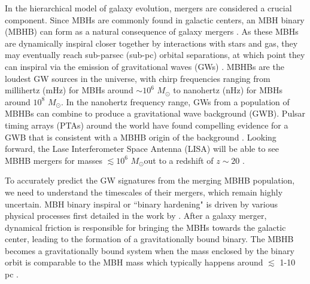 \documentclass{book}
\newcommand{\msun}{\ensuremath{M_{\odot}}}
\begin{document}
In the hierarchical model of galaxy evolution, mergers are considered a crucial component. Since MBHs are commonly found in galactic centers, an MBH binary (MBHB) can form as a natural consequence of galaxy mergers \citep{Begelman1980}. As these MBHs are dynamically inspiral closer together by interactions with stars and gas, they may eventually reach sub-parsec (sub-pc) orbital separations, at which point they can inspiral via the emission of gravitational waves (GWs) \citep{PetersandMathews1964}. MBHBs are the loudest GW sources in the universe, with chirp frequencies ranging from millihertz (mHz) for MBHs around $\sim 10^6$ \msun{} to nanohertz (nHz) for MBHs around $10^8$ \msun \citep{Sesana2013}. In the nanohertz frequency range, GWs from a population of MBHBs can combine to produce a gravitational wave background (GWB). Pulsar timing arrays (PTAs) around the world have found compelling evidence for a GWB that is consistent with a MBHB origin of the background \citep{agazie_nanograv_2023,antoniadis_second_2023,reardon_search_2023,xu_searching_2023}. Looking forward, the Lase Interferometer Space Antenna (LISA) will be able to see MBHB mergers for masses  $\lesssim 10^6$  \msun out to a redshift of $z \sim 20$ \citep{amaroseoane2017laserinterferometerspaceantenna}. 

To accurately predict the GW signatures from the merging MBHB population, we need to understand the timescales of their mergers, which remain highly uncertain. MBH binary inspiral or ``binary hardening" is driven by various physical processes first detailed in the work by \citet{Begelman1980}. After a galaxy merger, dynamical friction \citep{Antonini2012} is responsible for bringing the MBHs towards the galactic center, leading to the formation of a gravitationally bound binary. The MBHB becomes a gravitationally bound system when the mass enclosed by the binary orbit is comparable to the MBH mass which typically happens around $\lesssim$ 1-10 pc \citep{begelman_massive_1980,quinlan_dynamical_1996,Yu_2002}.
\end{document}
